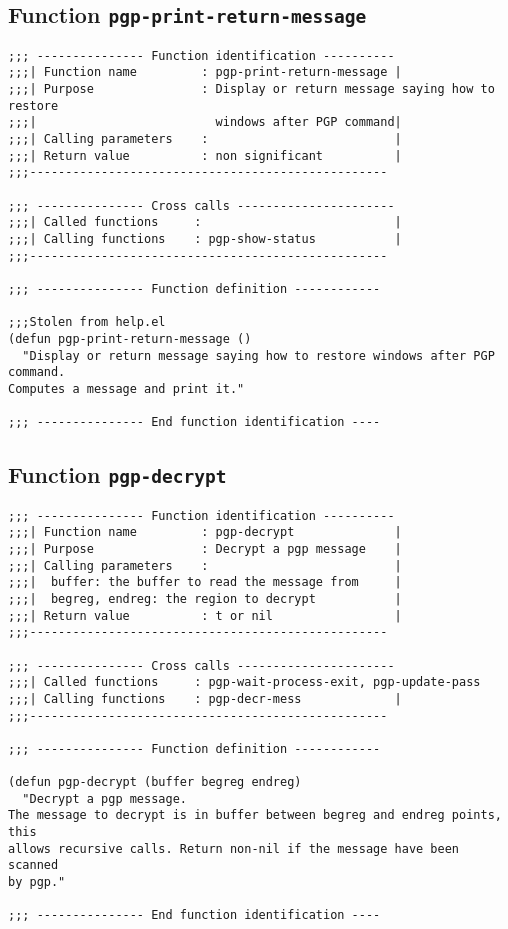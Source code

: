 \subsection{Function {\tt pgp-print-return-message}}
\leavevmode
\begin{verbatim}
;;; --------------- Function identification ----------
;;;| Function name         : pgp-print-return-message |
;;;| Purpose               : Display or return message saying how to restore
;;;|                         windows after PGP command|
;;;| Calling parameters    :                          |
;;;| Return value          : non significant          |
;;;--------------------------------------------------

;;; --------------- Cross calls ----------------------
;;;| Called functions     :                           |
;;;| Calling functions    : pgp-show-status           |
;;;--------------------------------------------------

;;; --------------- Function definition ------------

;;;Stolen from help.el
(defun pgp-print-return-message ()
  "Display or return message saying how to restore windows after PGP command.
Computes a message and print it."

;;; --------------- End function identification ----
\end{verbatim}
\subsection{Function {\tt pgp-decrypt}}
\leavevmode
\begin{verbatim}
;;; --------------- Function identification ----------
;;;| Function name         : pgp-decrypt              |
;;;| Purpose               : Decrypt a pgp message    |
;;;| Calling parameters    :                          |
;;;|  buffer: the buffer to read the message from     |
;;;|  begreg, endreg: the region to decrypt           |
;;;| Return value          : t or nil                 |
;;;--------------------------------------------------

;;; --------------- Cross calls ----------------------
;;;| Called functions     : pgp-wait-process-exit, pgp-update-pass
;;;| Calling functions    : pgp-decr-mess             |
;;;--------------------------------------------------

;;; --------------- Function definition ------------

(defun pgp-decrypt (buffer begreg endreg)
  "Decrypt a pgp message.
The message to decrypt is in buffer between begreg and endreg points, this
allows recursive calls. Return non-nil if the message have been scanned
by pgp."

;;; --------------- End function identification ----
\end{verbatim}
